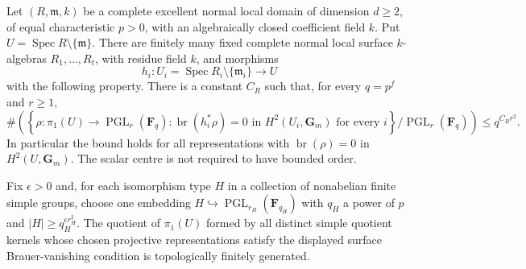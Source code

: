\begin{corollary}
\label{D:local-Brauer-zero-surface-transfer}
Let $(R,\mathfrak m,k)$ be a complete excellent normal local domain
of dimension $d\ge2$, of equal characteristic $p>0$, with an
algebraically closed coefficient field $k$. Put
$U=\operatorname{Spec}R\setminus\{\mathfrak m\}$.
There are finitely many fixed complete normal local surface
$k$-algebras $R_1,\ldots,R_t$, with residue field $k$, and
morphisms
\[
 h_i:U_i=\operatorname{Spec}R_i\setminus\{\mathfrak m_i\}
                         \longrightarrow U
\]
with the following property. There is a constant $C_R$ such that,
for every $q=p^f$ and $r\ge1$,
\[
 \#\left(\left\{\rho:\pi_1(U)\longrightarrow
       \operatorname{PGL}_r(\mathbf F_q):
       \operatorname{br}(h_i^*\rho)=0\text{ in }
              H^2(U_i,\mathbf G_m)\text{ for every }i
        \right\}/\operatorname{PGL}_r(\mathbf F_q)\right)
                       \le q^{C_Rr^2}.                 \tag{D.LBT.1}
\]
In particular the bound holds for all representations with
$\operatorname{br}(\rho)=0$ in $H^2(U,\mathbf G_m)$.
The scalar centre is not required to have bounded order.

Fix $\epsilon>0$ and, for each isomorphism type $H$ in a
collection of nonabelian finite simple groups, choose one
embedding $H\hookrightarrow\operatorname{PGL}_{r_H}(\mathbf F_{q_H})$
with $q_H$ a power of $p$ and
$|H|\ge q_H^{\epsilon r_H^2}$. The quotient of $\pi_1(U)$
formed by all distinct simple quotient kernels whose chosen
projective representations satisfy the displayed surface
Brauer-vanishing condition is topologically finitely generated.
\end{corollary}

